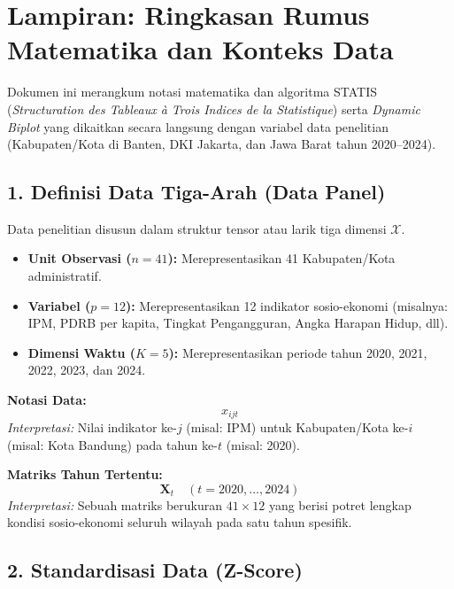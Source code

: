 \chapter*{Lampiran: Ringkasan Rumus Matematika dan Konteks Data}

Dokumen ini merangkum notasi matematika dan algoritma STATIS (\textit{Structuration des Tableaux à Trois Indices de la Statistique}) serta \textit{Dynamic Biplot} yang dikaitkan secara langsung dengan variabel data penelitian (Kabupaten/Kota di Banten, DKI Jakarta, dan Jawa Barat tahun 2020--2024).

\section*{1. Definisi Data Tiga-Arah (Data Panel)}

Data penelitian disusun dalam struktur tensor atau larik tiga dimensi $\mathcal{X}$.

\begin{itemize}
    \item \textbf{Unit Observasi ($n=41$):} Merepresentasikan 41 Kabupaten/Kota administratif.
    \item \textbf{Variabel ($p=12$):} Merepresentasikan 12 indikator sosio-ekonomi (misalnya: IPM, PDRB per kapita, Tingkat Pengangguran, Angka Harapan Hidup, dll).
    \item \textbf{Dimensi Waktu ($K=5$):} Merepresentasikan periode tahun 2020, 2021, 2022, 2023, dan 2024.
\end{itemize}

\textbf{Notasi Data:}
\begin{equation}
    x_{ijt}
\end{equation}
\textit{Interpretasi:} Nilai indikator ke-$j$ (misal: IPM) untuk Kabupaten/Kota ke-$i$ (misal: Kota Bandung) pada tahun ke-$t$ (misal: 2020).

\textbf{Matriks Tahun Tertentu:}
\begin{equation}
    \mathbf{X}_t \quad (t = 2020, \dots, 2024)
\end{equation}
\textit{Interpretasi:} Sebuah matriks berukuran $41 \times 12$ yang berisi potret lengkap kondisi sosio-ekonomi seluruh wilayah pada satu tahun spesifik.

\section*{2. Standardisasi Data (Z-Score)}

